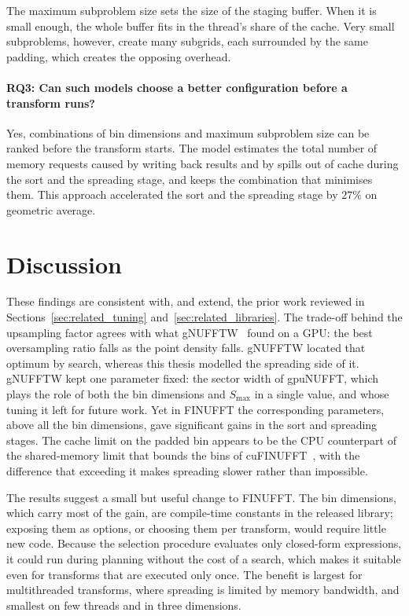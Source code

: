 The maximum subproblem size sets the size of the staging buffer. When it is
small enough, the whole buffer fits in the thread's share of the cache. Very
small subproblems, however, create many subgrids, each surrounded by the same
padding, which creates the opposing overhead.

\paragraph{RQ3: Can such models choose a better configuration before a
transform runs?}
Yes, combinations of bin dimensions and maximum subproblem size can be ranked
before the transform starts. The model estimates the total number of memory
requests caused by writing back results and by spills out of cache during the
sort and the spreading stage, and keeps the combination that minimises them.
This approach accelerated the sort and the spreading stage by $27\%$ on
geometric average.

\section{Discussion}
\label{sec:discussion}

These findings are consistent with, and extend, the prior work reviewed in
Sections~\ref{sec:related_tuning} and~\ref{sec:related_libraries}. The trade-off behind the upsampling factor
agrees with what gNUFFTW~\cite{ou2017} found on a GPU: the best oversampling
ratio falls as the point density falls. gNUFFTW located that optimum by search,
whereas this thesis modelled the spreading side of it. gNUFFTW kept one
parameter fixed: the sector width of gpuNUFFT, which plays the role of both the
bin dimensions and $S_{\max}$ in a single value, and whose tuning it left for
future work. Yet in FINUFFT the corresponding parameters, above all the bin
dimensions, gave significant gains in the sort and spreading stages. The cache
limit on the padded bin appears to be the CPU counterpart of the shared-memory
limit that bounds the bins of cuFINUFFT~\cite{shih2021}, with the difference
that exceeding it makes spreading slower rather than impossible.

The results suggest a small but useful change to FINUFFT. The bin dimensions,
which carry most of the gain, are compile-time constants in the released
library; exposing them as options, or choosing them per transform, would
require little new code. Because the selection procedure evaluates only
closed-form expressions, it could run during planning without the cost of a
search, which makes it suitable even for transforms that are executed only once.
The benefit is largest for multithreaded transforms, where spreading is limited
by memory bandwidth, and smallest on few threads and in three dimensions.

